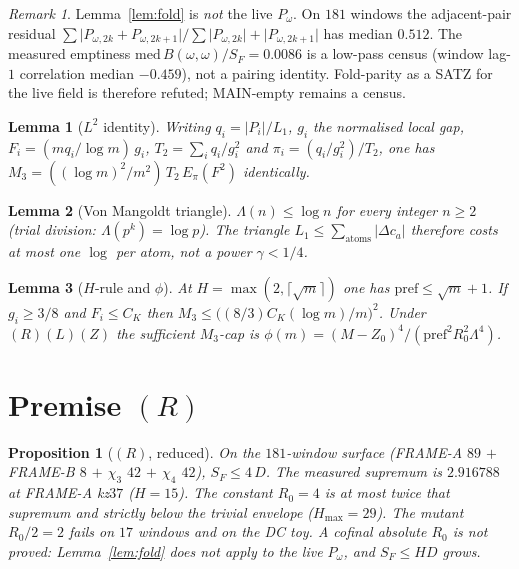 \documentclass[11pt]{article}
\newtheorem{lemma}{Lemma}
\newtheorem{prop}{Proposition}
\theoremstyle{remark}
\newtheorem{remark}{Remark}
\newcommand{\pref}{\mathrm{pref}}
\begin{document}
\begin{remark}\label{rem:fold}
Lemma~\ref{lem:fold} is \emph{not} the live $P_\omega$.
On $181$ windows the adjacent-pair residual
$\sum\lvert P_{\omega,2k}+P_{\omega,2k+1}\rvert/
\sum\lvert P_{\omega,2k}\rvert+\lvert P_{\omega,2k+1}\rvert$
has median $0.512$.  The measured emptiness
$\mathrm{med}\,B(\omega,\omega)/S_F=0.0086$ is a low-pass
census (window lag-$1$ correlation median $-0.459$), not a
pairing identity.  Fold-parity as a SATZ for the live field is
therefore refuted; MAIN-empty remains a census.
\end{remark}

\begin{lemma}[$L^2$ identity]\label{lem:l2}
Writing $q_i=\lvert P_i\rvert/L_1$, $g_i$ the normalised local
gap, $F_i=(m q_i/\log m)\,g_i$, $T_2=\sum_i q_i/g_i^2$ and
$\pi_i=(q_i/g_i^2)/T_2$, one has
$M_3=(({\log m})^2/m^2)\,T_2\,E_\pi(F^2)$ identically.
\end{lemma}

\begin{lemma}[Von Mangoldt triangle]\label{lem:lambda}
$\Lambda(n)\le\log n$ for every integer $n\ge 2$
(trial division: $\Lambda(p^k)=\log p$).
The triangle $L_1\le\sum_{\mathrm{atoms}}\lvert\Delta c_a\rvert$
therefore costs at most one $\log$ per atom, not a power
$\gamma<1/4$.
\end{lemma}

\begin{lemma}[$H$-rule and $\phi$]\label{lem:phi}
At $H=\max(2,\lceil\sqrt{m}\rceil)$ one has $\pref\le\sqrt{m}+1$.
If $g_i\ge 3/8$ and $F_i\le C_K$ then
$M_3\le\bigl((8/3)C_K(\log m)/m\bigr)^2$.
Under $(R)(L)(Z)$ the sufficient $M_3$-cap is
$\phi(m)=(M-Z_0)^4/(\pref^2 R_0^2\Lambda^4)$.
\end{lemma}

\section{Premise $(R)$}\label{sec:R}

\begin{prop}[$(R)$, reduced]\label{prop:R}
On the $181$-window surface (FRAME-A $89$ $+$ FRAME-B $8$ $+$
$\chi_3$ $42$ $+$ $\chi_4$ $42$),
$S_F\le 4\,D$.  The measured supremum is $2.916788$ at FRAME-A
kz$37$ ($H=15$).  The constant $R_0=4$ is at most twice that
supremum and strictly below the trivial envelope
($H_{\max}=29$).  The mutant $R_0/2=2$ fails on $17$ windows
and on the DC toy.  A cofinal absolute $R_0$ is not proved:
Lemma~\ref{lem:fold} does not apply to the live $P_\omega$,
and $S_F\le H D$ grows.
\end{prop}
\end{document}
